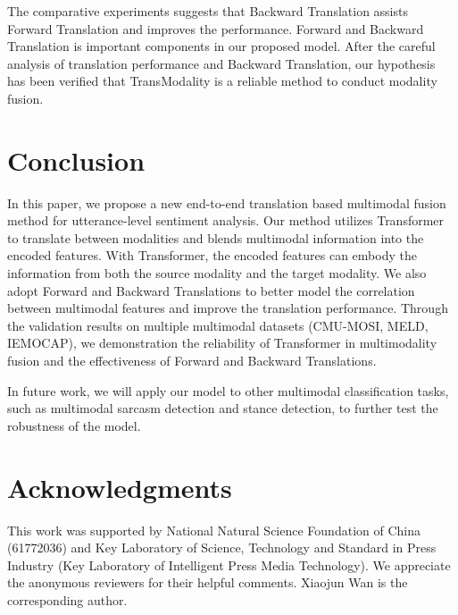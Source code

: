 \documentclass[sigconf]{acmart}
\begin{document}
	The comparative experiments suggests that Backward Translation assists Forward Translation and improves the performance. Forward and Backward Translation is important components in our proposed model.	After the careful analysis of translation performance and Backward Translation, our hypothesis has been verified that TransModality is a reliable method to conduct modality fusion.
	
	\section{Conclusion}
	In this paper, we propose a new end-to-end translation based multimodal fusion method for utterance-level sentiment analysis. Our method utilizes Transformer to translate between modalities and blends multimodal information into the encoded features. With Transformer, the encoded features can embody the information from both the source modality and the target modality. We also adopt Forward and Backward Translations to better model the correlation between multimodal features and improve the translation performance. Through the validation results on multiple multimodal datasets (CMU-MOSI, MELD, IEMOCAP), we demonstration the reliability of Transformer in multimodality fusion and the effectiveness of Forward and Backward Translations.
	
	In future work, we will apply our model to other multimodal classification tasks, such as multimodal sarcasm detection and stance detection, to further test the robustness of the model. 

	\section{Acknowledgments}
	This work was supported by National Natural Science Foundation of China (61772036) and Key Laboratory of Science, Technology and Standard in Press Industry (Key Laboratory of Intelligent Press Media Technology). We appreciate the anonymous reviewers for their helpful comments. Xiaojun Wan is the corresponding author.



\end{document}
